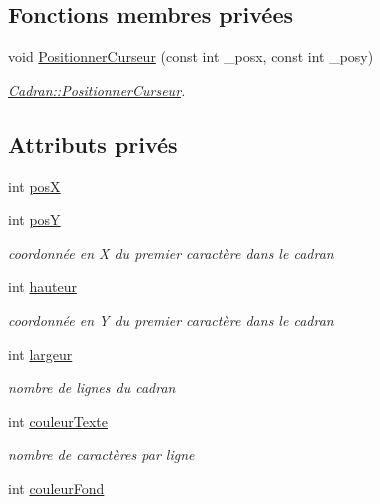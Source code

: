\subsection*{Fonctions membres privées}
\begin{DoxyCompactItemize}
\item 
void \hyperlink{class_cadran_aad5b68b6c93bfba09b0903eb7faacc9b}{Positionner\+Curseur} (const int \+\_\+posx, const int \+\_\+posy)
\begin{DoxyCompactList}\small\item\em \hyperlink{class_cadran_aad5b68b6c93bfba09b0903eb7faacc9b}{Cadran\+::\+Positionner\+Curseur}. \end{DoxyCompactList}\end{DoxyCompactItemize}
\subsection*{Attributs privés}
\begin{DoxyCompactItemize}
\item 
int \hyperlink{class_cadran_a4b753893bf4f7bb4b61018544ddb2450}{posX}
\item 
int \hyperlink{class_cadran_a9fe9e082e2421e00d044598765adcdeb}{posY}
\begin{DoxyCompactList}\small\item\em coordonnée en X du premier caractère dans le cadran \end{DoxyCompactList}\item 
int \hyperlink{class_cadran_a18a3e6147ef0d98e8f556b7a590c753e}{hauteur}
\begin{DoxyCompactList}\small\item\em coordonnée en Y du premier caractère dans le cadran \end{DoxyCompactList}\item 
int \hyperlink{class_cadran_a6c930bf327a38424afe4cb0ce75c0650}{largeur}
\begin{DoxyCompactList}\small\item\em nombre de lignes du cadran \end{DoxyCompactList}\item 
int \hyperlink{class_cadran_a2070501e183ca1fb9c495a6ba878a97e}{couleur\+Texte}
\begin{DoxyCompactList}\small\item\em nombre de caractères par ligne \end{DoxyCompactList}\item 
int \hyperlink{class_cadran_a2d7643e20b61690fc575421543757c7c}{couleur\+Fond}
\end{DoxyCompactItemize}


